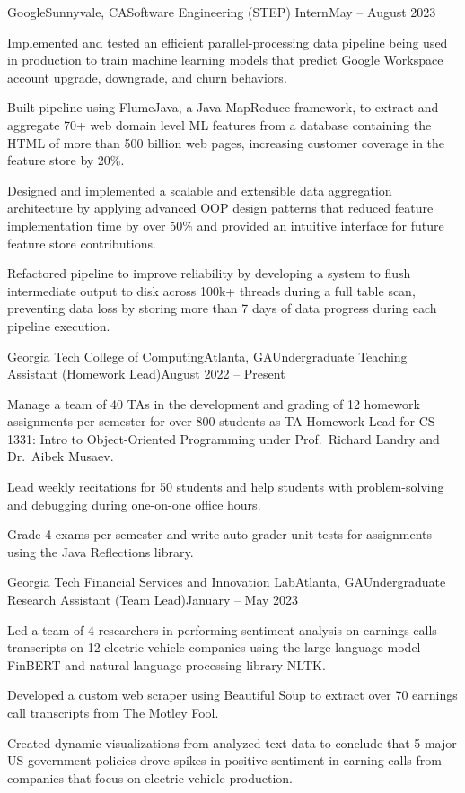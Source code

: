 \documentclass{article}
\begin{document}
\begin{flushleft}
    \begin{experience}{Google}{Sunnyvale, CA}{Software Engineering (STEP) Intern}{May -- August 2023}
        \item Implemented and tested an efficient parallel-processing data pipeline being used in production to train machine learning models that predict Google Workspace account upgrade, downgrade, and churn behaviors.
        \item Built pipeline using FlumeJava, a Java MapReduce framework, to extract and aggregate 70+ web domain level ML features from a database containing the HTML of more than 500 billion web pages, increasing customer coverage in the feature store by 20\%.
        \item Designed and implemented a scalable and extensible data aggregation architecture by applying advanced OOP design patterns that reduced feature implementation time by over 50\% and provided an intuitive interface for future feature store contributions.
        \item Refactored pipeline to improve reliability by developing a system to flush intermediate output to disk across 100k+ threads during a full table scan, preventing data loss by storing more than 7 days of data progress during each pipeline execution.
    \end{experience}

    \begin{experience}{Georgia Tech College of Computing}{Atlanta, GA}{Undergraduate Teaching Assistant (Homework Lead)}{August 2022 -- Present}
        \item Manage a team of 40 TAs in the development and grading of 12 homework assignments per semester for over 800 students as TA Homework Lead for CS 1331: Intro to Object-Oriented Programming under Prof.~Richard Landry and Dr.~Aibek Musaev.
        \item Lead weekly recitations for 50 students and help students with problem-solving and debugging during one-on-one office hours.
        \item Grade 4 exams per semester and write auto-grader unit tests for assignments using the Java Reflections library.
    \end{experience}

    \begin{experience}{Georgia Tech Financial Services and Innovation Lab}{Atlanta, GA}{Undergraduate Research Assistant (Team Lead)}{January -- May 2023}
        \item Led a team of 4 researchers in performing sentiment analysis on earnings calls transcripts on 12 electric vehicle companies using the large language model FinBERT and natural language processing library NLTK.
        \item Developed a custom web scraper using Beautiful Soup to extract over 70 earnings call transcripts from The Motley Fool.
        \item Created dynamic visualizations from analyzed text data to conclude that 5 major US government policies drove spikes in positive sentiment in earning calls from companies that focus on electric vehicle production.
    \end{experience}


\end{flushleft}
\end{document}
